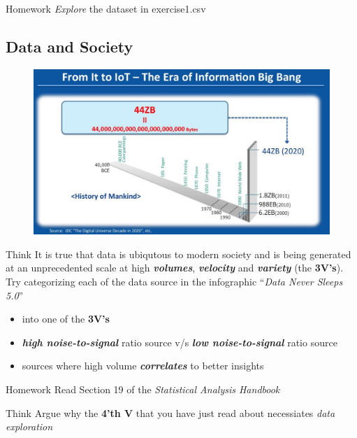 \begin{DIY}{Homework}
\emph{Explore} the dataset in exercise1.csv
\end{DIY}
\subsection{Data and Society}
\begin{figure}[ht]
 \centering
    \includegraphics[width = 10 cm]{./viz/ext/DataVolumesVSHumanHistory.jpeg}
\end{figure}

\begin{DIY}{Think}
It is true that data is ubiqutous to modern society and is being generated at an unprecedented scale at high \textbf{\emph{volumes}}, \textbf{\emph{velocity}} and \textbf{\emph{variety}} (the \textbf{3V's}). Try categorizing each of the data source in the infographic ``\emph{Data Never Sleeps 5.0}''
\begin{itemize}
  \item into one of the \textbf{3V's}  
  \item \textbf{\emph{high noise-to-signal}} ratio source v/s \textbf{\emph{low noise-to-signal}} ratio source
  \item sources where high volume \textbf{\emph{correlates}} to better insights 
\end{itemize}
\end{DIY}

\begin{DIY}{Homework}
Read Section 19 of the \emph{Statistical Analysis Handbook}
\end{DIY}

\begin{DIY}{Think}
Argue why the \textbf{4'th V} that you have just read about necessiates \emph{data exploration}
\end{DIY}

